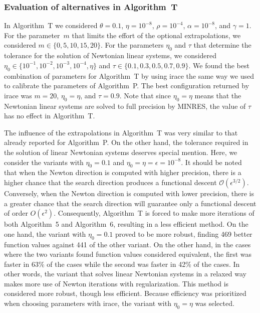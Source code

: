 \documentclass[11pt]{article}
\begin{document}
\subsubsection{Evaluation of alternatives in Algorithm~T}

In Algorithm~T we considered $\theta = 0.1$, $\eta = 10^{-8}$, $\rho = 10^{-4}$, $\alpha = 10^{-8}$, and $\gamma = 1$. For the parameter~$m$ that limits the effort of the optional extrapolations, we considered $m \in \{0, 5, 10, 15, 20\}$. For the parameters $\eta_0$ and $\tau$ that determine the tolerance for the solution of Newtonian linear systems, we considered $\eta_0 \in \{ 10^{-1}, 10^{-2}, 10^{-3}, 10^{-4}, \eta \}$ and $\tau \in \{ 0.1, 0.3, 0.5, 0.7, 0.9 \}$. We found the best combination of parameters for Algorithm~T by using irace the same way we used to calibrate the parameters of Algorithm~P. The best configuration returned by irace was $m=20$, $\eta_0 = \eta$, and $\tau = 0.9$. Note that since $\eta_0=\eta$ means that the Newtonian linear systems are solved to full precision by MINRES, the value of $\tau$ has no effect in Algorithm~T.

The influence of the extrapolations in Algorithm~T was very similar to that already reported for Algorithm~P. On the other hand, the tolerance required in the solution of linear Newtonian systems deserves special mention. Here, we consider the variants with $\eta_0=0.1$ and $\eta_0=\eta=\epsilon=10^{-8}$. It should be noted that when the Newton direction is computed with higher precision, there is a higher chance that the search direction produces a functional descent $\mathcal{O}(\epsilon^{3/2})$. Conversely, when the Newton direction is computed with lower precision, there is a greater chance that the search direction will guarantee only a functional descent of order $O(\epsilon^2)$. Consequently, Algorithm~T is forced to make more iterations of both Algorithm~5 and Algorithm~6, resulting in a less efficient method. On the one hand, the variant with $\eta_0=0.1$ proved to be more robust, finding 469 better function values against 441 of the other variant. On the other hand, in the cases where the two variants found function values considered equivalent, the first was faster in 63\% of the cases while the second was faster in 42\% of the cases. In other words, the variant that solves linear Newtonian systems in a relaxed way makes more use of Newton iterations with regularization. This method is considered more robust, though less efficient. Because efficiency was prioritized when choosing parameters with irace, the variant with $\eta_0=\eta$ was selected.
\end{document}
